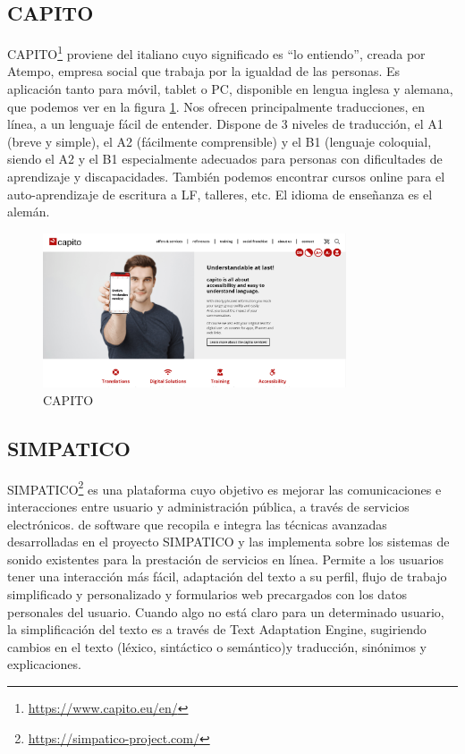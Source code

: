 \subsection{CAPITO }

CAPITO\footnote{\href{https://www.capito.eu/en/}{https://www.capito.eu/en/}} proviene del italiano cuyo significado es ``lo entiendo'', creada por Atempo, empresa social que trabaja por la igualdad de las personas. Es aplicación tanto para móvil, tablet o PC, disponible en lengua inglesa y alemana, que podemos ver en la figura \ref{fig:capito}. Nos ofrecen principalmente traducciones, en línea, a un lenguaje fácil de entender. Dispone de 3 niveles de traducción, el A1 (breve y simple), el A2 (fácilmente comprensible) y el B1 (lenguaje coloquial, siendo el A2 y el B1 especialmente adecuados para personas con dificultades de aprendizaje y discapacidades. 
También podemos encontrar cursos online para el auto-aprendizaje de escritura a LF, talleres, etc. El idioma de enseñanza es el alemán.
\begin{figure}[h]
	\centering
	\includegraphics[width=0.8\textwidth]{Imagenes/ProyectosMateriales/capito}
	\caption{CAPITO}
	\label{fig:capito}
\end{figure} 

\newpage
\subsection{SIMPATICO }

SIMPATICO\footnote{\href{https://simpatico-project.com/}{https://simpatico-project.com/}} es una plataforma cuyo objetivo es mejorar las comunicaciones e interacciones entre usuario y administración pública, a través de servicios electrónicos.
de software que recopila e integra las técnicas avanzadas desarrolladas en el proyecto SIMPATICO y las implementa sobre los sistemas de sonido 
existentes para la prestación de servicios en línea. Permite a los usuarios tener una interacción más fácil, adaptación del texto a su perfil, flujo de trabajo simplificado y personalizado y formularios web precargados con los datos personales del usuario.
Cuando algo no está claro para un determinado usuario, la simplificación del texto es a través de Text Adaptation Engine, sugiriendo cambios en el texto (léxico, sintáctico o semántico)y traducción, sinónimos y explicaciones. 

